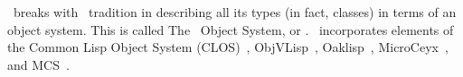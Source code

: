 \begin{introduction}
\begin{optDefinition}
\eulisp\ breaks with \lisp\ tradition in describing all its types (in fact,
classes) in terms of an object system.  This is called The \eulisp\ Object
System, or \telos. \telos\ incorporates elements of the Common Lisp Object
System (CLOS)~,
ObjVLisp~,
Oaklisp~,
MicroCeyx~, and
MCS~.
\end{optDefinition}

\end{introduction}
